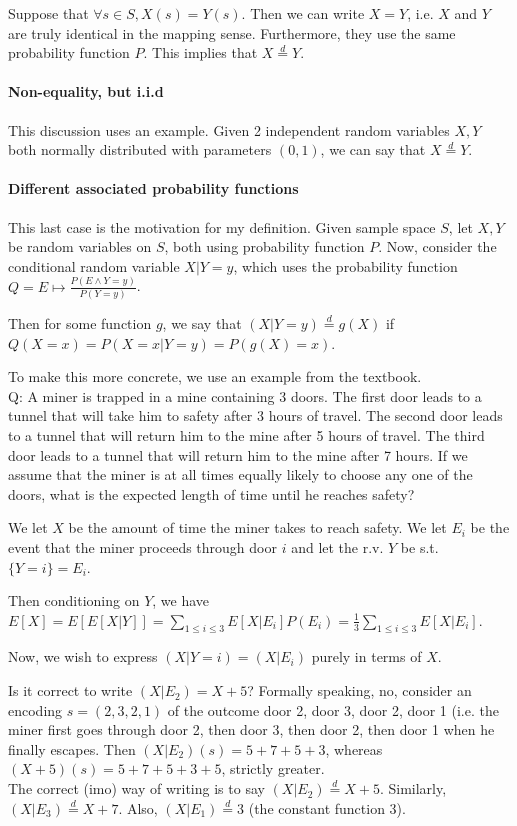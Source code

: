 \documentclass{article}
\newcommand{\eqdis}[0]{\stackrel{d}{=}}
\begin{document}
Suppose that $\forall s\in S, X(s) = Y(s)$. Then we can write $X=Y$, i.e. $X$ and $Y$ are truly identical in the mapping sense. Furthermore, they use the same probability function $P$. This implies that $X\eqdis Y$.

\paragraph{Non-equality, but i.i.d} This discussion uses an example. Given 2 independent random variables $X,Y$ both normally distributed with parameters $(0,1)$, we can say that $X\eqdis Y$.

\paragraph{Different associated probability functions} This last case is the motivation for my definition. Given sample space $S$, let $X, Y$ be random variables on $S$, both using probability function $P$. Now, consider the conditional random variable $X|Y=y$, which uses the probability function $Q = E\mapsto \frac{P(E\land Y=y)}{P(Y=y)}$.

Then for some function $g$, we say that $(X|Y=y) \eqdis g(X)$ if $Q(X=x) = P(X=x|Y=y) = P(g(X) = x)$.

To make this more concrete, we use an example from the textbook.\\
Q: A miner is trapped in a mine containing 3 doors. The first door leads to a tunnel that will take him to safety after 3 hours of travel. The second door leads to a tunnel that will return him to the mine after 5 hours of travel. The third door leads to a tunnel that will return him to the mine after 7 hours. If we assume that the miner is at all times equally likely to choose any one of the doors, what is the expected length of time until he reaches safety?

We let $X$ be the amount of time the miner takes to reach safety. We let $E_i$ be the event that the miner proceeds through door $i$ and let the r.v. $Y$ be s.t. $\{Y=i\} = E_i$.

Then conditioning on $Y$, we have $E[X] = E[E[X|Y]] = \sum_{1\leq i\leq 3}E[X|E_i]P(E_i) = \frac{1}{3}\sum_{1\leq i\leq 3}E[X|E_i]$.

Now, we wish to express $(X|Y=i) = (X|E_i)$ purely in terms of $X$.


Is it correct to write $(X|E_2) = X+5$? Formally speaking, no, consider an encoding $s=(2,3,2,1)$ of the outcome door 2, door 3, door 2, door 1 (i.e. the miner first goes through door 2, then door 3, then door 2, then door 1 when he finally escapes. Then $(X|E_2)(s) = 5 + 7 + 5 + 3$, whereas $(X+5)(s) = 5 + 7 + 5 + 3 + 5$, strictly greater.\\
The correct (imo) way of writing is to say $(X|E_2)\eqdis X+5$. Similarly, $(X|E_3)\eqdis X+7$. Also, $(X|E_1) \eqdis 3$ (the constant function $3$).
\end{document}
